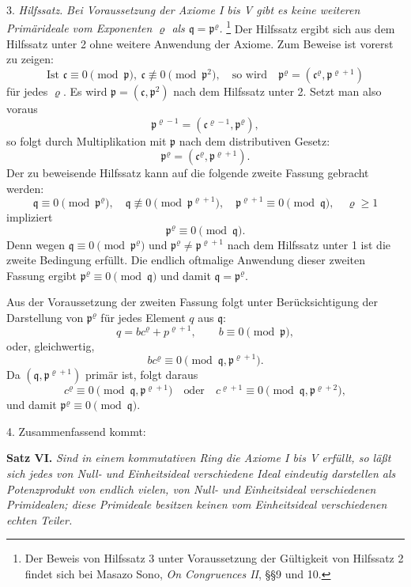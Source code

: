 \documentclass[11pt]{article}
\providecommand{\mc}{\mathfrak{c}}
\providecommand{\mpideal}{\mathfrak{p}}
\providecommand{\mq}{\mathfrak{q}}
\begin{document}
3. \emph{Hilfssatz.} \emph{Bei Voraussetzung der Axiome I bis V gibt es keine weiteren Primärideale vom Exponenten $\varrho$ als $\mq=\mpideal^\varrho$.}
\footnote{Der Beweis von Hilfssatz 3 unter Voraussetzung der Gültigkeit von Hilfssatz 2 findet sich bei Masazo Sono, \emph{On Congruences II}, §§9 und 10.}
Der Hilfssatz ergibt sich aus dem Hilfssatz unter 2 ohne weitere Anwendung der Axiome. Zum Beweise ist vorerst zu zeigen:
\[
        \text{Ist }\mc\equiv0\pmod{\mpideal},\ \mc\not\equiv0\pmod{\mpideal^2},
        \quad\text{so wird}\quad
        \mpideal^\varrho=(\mc^\varrho,\mpideal^{\varrho+1})
\]
für jedes $\varrho$. Es wird $\mpideal=(\mc,\mpideal^2)$ nach dem Hilfssatz unter 2. Setzt man also voraus
\[
        \mpideal^{\varrho-1}=(\mc^{\varrho-1},\mpideal^\varrho),
\]
so folgt durch Multiplikation mit $\mpideal$ nach dem distributiven Gesetz:
\[
        \mpideal^\varrho=(\mc^\varrho,\mpideal^{\varrho+1}).
\]
Der zu beweisende Hilfssatz kann auf die folgende zweite Fassung gebracht werden:
\[
        \mq\equiv0\pmod{\mpideal^\varrho},
        \quad \mq\not\equiv0\pmod{\mpideal^{\varrho+1}},
        \quad \mpideal^{\varrho+1}\equiv0\pmod{\mq},
        \quad \varrho\ge1
\]
impliziert
\[
        \mpideal^\varrho\equiv0\pmod{\mq}.
\]
Denn wegen $\mq\equiv0\pmod{\mpideal^\varrho}$ und $\mpideal^\varrho\ne\mpideal^{\varrho+1}$ nach dem Hilfssatz unter 1 ist die zweite Bedingung erfüllt. Die endlich oftmalige Anwendung dieser zweiten Fassung ergibt $\mpideal^\varrho\equiv0\pmod{\mq}$ und damit $\mq=\mpideal^\varrho$.

Aus der Voraussetzung der zweiten Fassung folgt unter Berücksichtigung der Darstellung von $\mpideal^\varrho$ für jedes Element $q$ aus $\mq$:
\[
        q=b c^\varrho+p^{\varrho+1},
        \qquad b\equiv0\pmod{\mpideal},
\]
oder, gleichwertig,
\[
        bc^\varrho\equiv0\pmod{\mq,\mpideal^{\varrho+1}}.
\]
Da $(\mq,\mpideal^{\varrho+1})$ primär ist, folgt daraus
\[
        c^\varrho\equiv0\pmod{\mq,\mpideal^{\varrho+1}}
        \quad\text{oder}\quad
        c^{\varrho+1}\equiv0\pmod{\mq,\mpideal^{\varrho+2}},
\]
und damit $\mpideal^\varrho\equiv0\pmod{\mq}$.

4. Zusammenfassend kommt:

\textbf{Satz VI.} \emph{Sind in einem kommutativen Ring die Axiome I bis V erfüllt, so läßt sich jedes von Null- und Einheitsideal verschiedene Ideal eindeutig darstellen als Potenzprodukt von endlich vielen, von Null- und Einheitsideal verschiedenen Primidealen; diese Primideale besitzen keinen vom Einheitsideal verschiedenen echten Teiler.}
\end{document}
